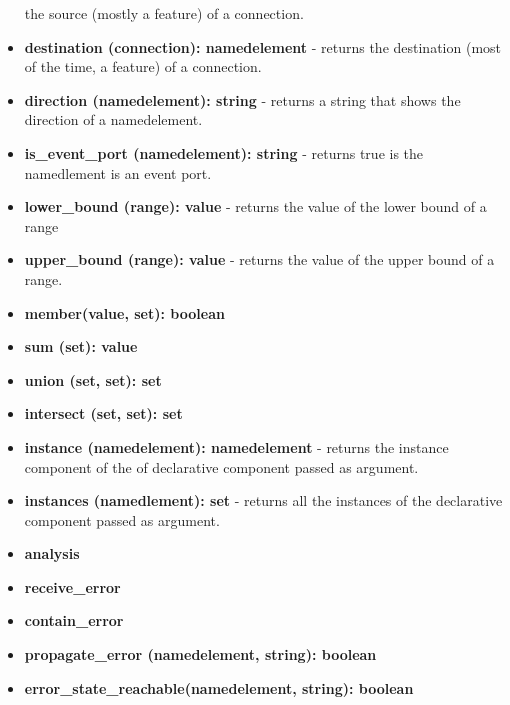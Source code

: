 \documentclass[times, 10pt]{article}
\begin{document}
\begin{itemize}
        the source (mostly a feature) of a connection.
    \item
        \textbf{destination (connection): namedelement} - returns
        the destination (most of the time, a feature) of a connection.
    \item
        \textbf{direction (namedelement): string} - returns a string
        that shows the direction of a namedelement.
    \item
        \textbf{is\_event\_port (namedelement): string} - returns
        true is the namedlement is an event port.
    \item
        \textbf{lower\_bound (range): value} - returns
        the value of the lower bound of a range
    \item
        \textbf{upper\_bound (range): value} - returns the value
        of the upper bound of a range.
    \item
        \textbf{member(value, set): boolean}
    \item
        \textbf{sum (set): value}
    \item
        \textbf{union (set, set): set}
    \item
        \textbf{intersect (set, set): set}
    \item
        \textbf{instance (namedelement): namedelement} - returns the instance
        component of the of declarative component passed as argument.
    \item
        \textbf{instances (namedlement): set} - returns all
        the instances of the declarative component passed as argument.
    \item
        \textbf{analysis}
    \item
        \textbf{receive\_error}
    \item
        \textbf{contain\_error}
    \item
        \textbf{propagate\_error (namedelement, string): boolean}
    \item
        \textbf{error\_state\_reachable(namedelement, string): boolean}
\end{itemize}
\end{document}
